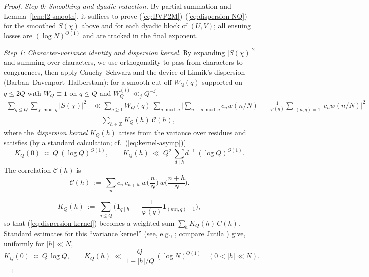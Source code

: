 \documentclass[11pt]{article}
\def\eqref#1{(\ref{#1})}%
\theoremstyle{definition}
\theoremstyle{remark}
\numberwithin{equation}{part}
\begin{document}
\begin{proof}
	\emph{Step 0: Smoothing and dyadic reduction.}
	By partial summation and Lemma~\ref{lem:l2-smooth}, it suffices to prove \eqref{eq:BVP2M}--\eqref{eq:dispersion-NQ} for the smoothed $S(\chi)$ above and for each dyadic block of $(U,V)$; all ensuing losses are $(\log N)^{O(1)}$ and are tracked in the final exponent.

	\smallskip
	\emph{Step 1: Character-variance identity and dispersion kernel.}
	By expanding $|S(\chi)|^2$ and summing over characters, we use orthogonality to pass from characters to congruences, then apply Cauchy--Schwarz and the device of Linnik's dispersion (Barban--Davenport--Halberstam): for a smooth cut-off $W_Q(q)$ supported on $q\le 2Q$ with $W_Q\equiv 1$ on $q\le Q$ and $W_Q^{(j)}\ll_j Q^{-j}$,
	\begin{align}
		\sum_{q\le Q}\sum_{\chi \bmod q} |S(\chi)|^2
		 & \ll \sum_{q\ge 1} W_Q(q)\ \sum_{a\bmod q}\Big|\sum_{n\equiv a\bmod q} c_n w(n/N)\ -\ \tfrac{1}{\varphi(q)}\sum_{\substack{(n,q)=1}} c_n w(n/N)\Big|^2 \nonumber \\
		 & = \sum_{h\in\mathbb Z} K_Q(h)\ \mathcal C(h), \label{eq:dispersion-kernel}
	\end{align}
	where the \emph{dispersion kernel} $K_Q(h)$ arises from the variance over residues and satisfies (by a standard calculation; cf.\ \eqref{eq:kernel-asymp})
	\begin{equation}\label{eq:kernel-bounds}
		K_Q(0)\ \asymp\ Q\ (\log Q)^{O(1)}, \qquad
		K_Q(h)\ \ll\ Q^2\ \sum_{d\mid h} d^{-1}\ (\log Q)^{O(1)}.
	\end{equation}
	The correlation $\mathcal C(h)$ is
	\[
		\mathcal C(h)\ :=\ \sum_{n} c_n\,\overline{c_{n+h}}\ w\!\Big(\frac{n}{N}\Big)\,w\!\Big(\frac{n+h}{N}\Big).
	\]

	\[
		K_Q(h)\ :=\ \sum_{q\le Q}\Big(\mathbf{1}_{q\mid h}\ -\ \frac{1}{\varphi(q)}\mathbf{1}_{(mn,q)=1}\Big),
	\]
	so that \eqref{eq:dispersion-kernel} becomes a weighted sum $\sum_h K_Q(h)\,C(h)$. Standard estimates for this “variance kernel”
	(see, e.g., \cite[Eq.~(12.52), Lem.~12.15]{MontgomeryVaughan}; compare Jutila \cite[Lem.~1]{Jutila00})
	give, uniformly for $|h|\ll N$,
	\begin{equation}\label{eq:kernel-asymp}
		K_Q(0)\ \asymp\ Q\,\log Q,
		\qquad
		K_Q(h)\ \ll\ \frac{Q}{1+|h|/Q}\,(\log N)^{O(1)}\quad(0<|h|\ll N).
	\end{equation}


\end{proof}
\end{document}
